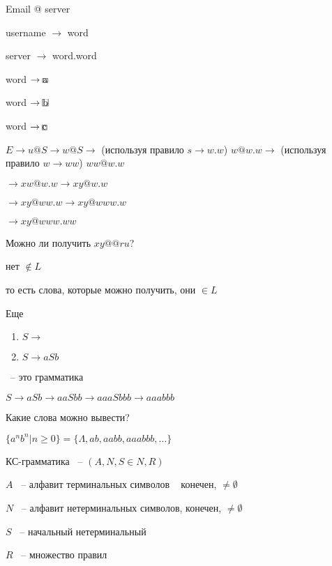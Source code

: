 \documentclass[russian]{lecture-notes}
\begin{document}
\begin{example}
	Email @ server
	
	username $\rightarrow$ word
	
	server $\rightarrow$ word.word
	
	word $\rightarrow \frame{a}$
	
	word $\rightarrow \frame{b}$
	
	word $\rightarrow \frame{c}$ 
	
	$E \rightarrow u@S \rightarrow w@S \rightarrow$ (используя правило $s \rightarrow w.w$) $w@w.w \rightarrow$ (используя правило $w \rightarrow ww$) $ww@w.w$
	
	$\rightarrow xw@w.w \rightarrow xy@w.w$
	
	$\rightarrow xy@ww.w \rightarrow xy@www.w$
	
	$\rightarrow xy@www.ww$
\end{example}

	Можно ли получить $xy@@ru$?
	
	нет $\notin L$
	
	то есть слова, которые можно получить, они $\in L$
	
\begin{example}

	Еще

	\begin{enumerate}
		\item{
			$S \rightarrow$		
		}
		\item{
			$S \rightarrow aSb$		
		}
	\end{enumerate}
	
	~-- это грамматика 
	
	$S \rightarrow aSb \rightarrow aaSbb \rightarrow aaaSbbb \rightarrow aaabbb$
	
	Какие слова можно вывести?
	
	$\{ a^n b^n | n \geq 0\} = \{ \Lambda, ab, aabb, aaabbb, \dots  \}$
\end{example}

\begin{definition}
	КС-грамматика ~-- $(A, N, S \in N, R)$
	
	$A$ ~-- алфавит терминальных символов ~ конечен, $\neq \emptyset$
	
	$N$ ~-- алфавит нетерминальных символов, конечен, $\neq \emptyset$
	
	$S$ ~-- начальный нетерминальный
	
	$R$ ~-- множество правил
\end{definition}
\end{document}
